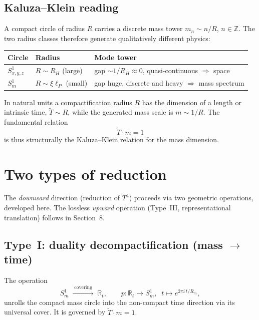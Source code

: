 \subsection{Kaluza--Klein reading}

A compact circle of radius $R$ carries a discrete mass tower $m_n \sim n/R$,
$n \in \mathbb{Z}$. The two radius classes therefore generate qualitatively
different physics:

\begin{center}
\begin{tabular}{lll}
\hline
\textbf{Circle} & \textbf{Radius} & \textbf{Mode tower} \\
\hline
$S^1_{x,y,z}$ & $R\sim R_H$ (large) & gap $\sim 1/R_H \approx 0$, quasi-continuous $\Rightarrow$ space \\
$S^1_m$ & $R\sim \xi\ell_P$ (small) & gap huge, discrete and heavy $\Rightarrow$ mass spectrum \\
\hline
\end{tabular}
\end{center}

\begin{proposition}[$\tilde T m = 1$ as compactification relation]\label{prop:tm}
In natural units a compactification radius $R$ has the dimension of a length or
intrinsic time, $\tilde{T}\sim R$, while the generated mass scale is
$m \sim 1/R$. The fundamental relation
\[
  \boxed{\;\tilde{T}\cdot m = 1\;}
\]
is thus structurally the Kaluza--Klein relation for the mass dimension.
\end{proposition}

\section{Two types of reduction}

The \emph{downward} direction (reduction of $T^4$) proceeds via two geometric
operations, developed here. The lossless \emph{upward} operation (Type~III,
representational translation) follows in Section~8.

\subsection{Type~I: duality decompactification (mass $\to$ time)}

\begin{definition}\label{def:typeI}
The operation
\[
  S^1_m \;\xrightarrow{\;\text{covering}\;}\; \mathbb{R}_t,
  \qquad p:\mathbb{R}_t \to S^1_m,\;\; t \mapsto e^{2\pi i\, t / R_m},
\]
unrolls the compact mass circle into the non-compact time direction via its
universal cover. It is governed by $\tilde{T}\cdot m = 1$.
\end{definition}

